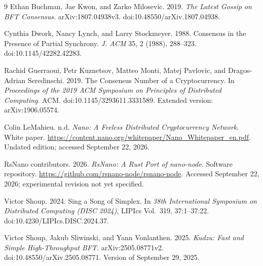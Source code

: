\documentclass[10pt,twocolumn]{article}
\begin{document}
\begin{thebibliography}{9}
Ethan Buchman, Jae Kwon, and Zarko Milosevic. 2019. \emph{The Latest Gossip on BFT Consensus}. arXiv:1807.04938v3. doi:10.48550/arXiv.1807.04938.

Cynthia Dwork, Nancy Lynch, and Larry Stockmeyer. 1988. Consensus in the Presence of Partial Synchrony. \emph{J. ACM} 35, 2 (1988), 288--323. doi:10.1145/42282.42283.

Rachid Guerraoui, Petr Kuznetsov, Matteo Monti, Matej Pavlovic, and Dragos-Adrian Seredinschi. 2019. The Consensus Number of a Cryptocurrency. In \emph{Proceedings of the 2019 ACM Symposium on Principles of Distributed Computing}. ACM. doi:10.1145/3293611.3331589. Extended version: arXiv:1906.05574.

Colin LeMahieu. n.d. \emph{Nano: A Feeless Distributed Cryptocurrency Network}. White paper. \url{https://content.nano.org/whitepaper/Nano_Whitepaper_en.pdf}. Undated edition; accessed September 22, 2026.

RsNano contributors. 2026. \emph{RsNano: A Rust Port of nano-node}. Software repository. \url{https://github.com/rsnano-node/rsnano-node}. Accessed September 22, 2026; experimental revision not yet specified.

Victor Shoup. 2024. Sing a Song of Simplex. In \emph{38th International Symposium on Distributed Computing (DISC 2024)}, LIPIcs Vol.~319, 37:1--37:22. doi:10.4230/LIPIcs.DISC.2024.37.

Victor Shoup, Jakub Sliwinski, and Yann Vonlanthen. 2025. \emph{Kudzu: Fast and Simple High-Throughput BFT}. arXiv:2505.08771v2. doi:10.48550/arXiv.2505.08771. Version of September 29, 2025.
\end{thebibliography}
\end{document}
